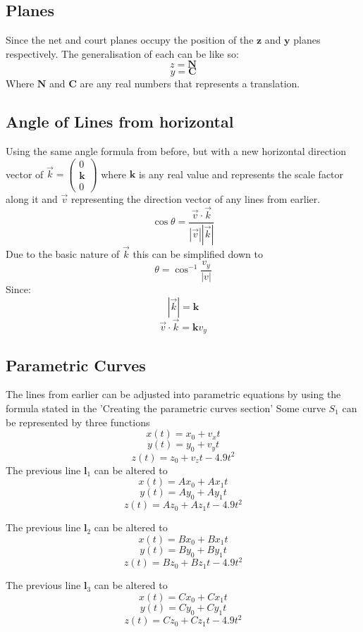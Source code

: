 \documentclass{article}
\begin{document}
													\subsection*{Planes}
													Since the net and court planes occupy the position of the \(\mathbf{z}\) and \(\mathbf{y}\) planes respectively. The generalisation of each can be like so:
													\[z = \mathbf{N}\]
													\[y = \mathbf{C}\]
													Where \(\mathbf{N}\) and \(\mathbf{C}\) are any real numbers that represents a translation.
													\subsection*{Angle of Lines from horizontal}
													Using the same angle formula from before, but with a new horizontal direction vector of \(\vec{k} = \begin{pmatrix} 0 \\ \mathbf{k} \\ 0 \end{pmatrix}\) where \(\mathbf{k}\) is any real value and represents the scale factor along it and \(\vec{v}\) representing the direction vector of any lines from earlier. 
													\[\cos \theta = \frac{\vec{v} \cdot \vec{k}}{|\vec{v}||\vec{k}|}\]
													Due to the basic nature of \(\vec{k}\) this can be simplified down to 
													\[\theta = \cos^{-1}\frac{v_{y}}{|v|}\]
													Since:
													\[|\vec{k}| = \mathbf{k}\]
													\[\vec{v} \cdot \vec{k} = \mathbf{k}v_{y}\]
													\subsection*{Parametric Curves}
													The lines from earlier can be adjusted into parametric equations by using the formula stated in the 'Creating the parametric curves section'
													Some curve \(S_{1}\) can be represented by three functions \[x(t) = x_{0} + v_{x}t\]
													\[y(t) = y_{0} + v_{y}t\]
													\[z(t) = z_{0} + v_{z}t - 4.9t^{2}\]
													The previous line \(\mathbf{l}_1\) can be altered to 
													\[x(t) = Ax_{0} + Ax_{1}t\]
													\[y(t) = Ay_{0} + Ay_{1}t\]
													\[z(t) = Az_{0} + Az_{1}t - 4.9t^{2}\]

													The previous line \(\mathbf{l}_2\) can be altered to 
													\[x(t) = Bx_{0} + Bx_{1}t\]
													\[y(t) = By_{0} + By_{1}t\]
													\[z(t) = Bz_{0} + Bz_{1}t - 4.9t^{2}\]

													The previous line \(\mathbf{l}_3\) can be altered to 
													\[x(t) = Cx_{0} + Cx_{1}t\]
													\[y(t) = Cy_{0} + Cy_{1}t\]
													\[z(t) = Cz_{0} + Cz_{1}t - 4.9t^{2}\]
\end{document}
